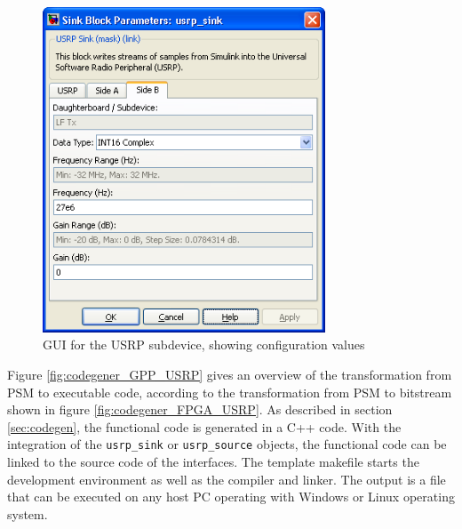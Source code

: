\begin{figure}
	\centering
		\includegraphics[width=0.75\textwidth]{../kapitel03/figures/usrp_sink_mask_subdev.png}
	\caption{GUI for the USRP subdevice, showing configuration values}
	\label{fig:usrp_sink_mask_subdev}
\end{figure}

Figure \ref{fig:codegener_GPP_USRP} gives an overview of the transformation from \ac{PSM} to executable code, according to the transformation from \ac{PSM} to bitstream shown in figure \ref{fig:codegener_FPGA_USRP}. As described in section \ref{sec:codegen}, the functional code is generated in a C++ code. With the integration of the \texttt{usrp\_sink} or \texttt{usrp\_source} objects, the functional code can be linked to the source code of the interfaces. The template makefile starts the development environment as well as the compiler and linker. The output is a file that can be executed on any host PC operating with Windows or Linux operating system. 

